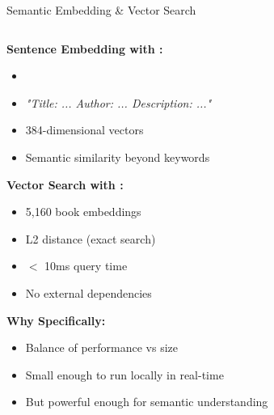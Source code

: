 \begin{frame}{Semantic Embedding \& Vector Search}

\begin{columns}[T]
  \begin{column}{0.50\textwidth}
    \textbf{Sentence Embedding with :}
    \begin{itemize}
      \item {} 
      \item {}
        {\scriptsize \textit{"Title: ... Author: ... Description: ..."}}
      \item {} 384-dimensional vectors
      \item {} Semantic similarity beyond keywords
    \end{itemize}

    \vspace{0.3cm}
    \textbf{Vector Search with :}
    \begin{itemize}
      \item {} 5,160 book embeddings
      \item {} L2 distance (exact search)
      \item {} $<$ 10ms query time
      \item {} No external dependencies
    \end{itemize}

	\vspace{0.2cm}
    \textbf{Why  Specifically:}
    \begin{itemize}
        \item Balance of performance vs size
        \item Small enough to run locally in real-time
        \item But powerful enough for semantic understanding
    \end{itemize}

  \end{column}

  \begin{column}{0.45\textwidth}
    \centering
\end{column}
\end{columns}
\end{frame}
